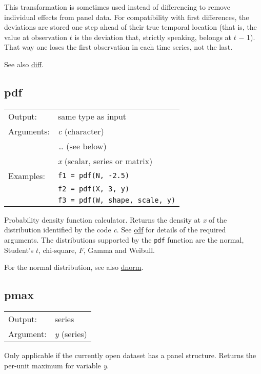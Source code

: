 	  This transformation is sometimes used instead of differencing to
	  remove individual effects from panel data.  For compatibility with
	  first differences, the deviations are stored one step ahead of their
	  true temporal location (that is, the value at observation
	  \ensuremath{t} is the deviation that, strictly speaking, belongs at
	  \ensuremath{t} $-$ 1).  That way one loses the first observation
	  in each time series, not the last.

	  See also \hyperlink{func-diff}{diff}.

\subsection{pdf}
\hypertarget{func-pdf}{}

\begin{tabular}{ll}
Output:     & same type as input\\
Arguments:  & \textsl{c} (character)\\
           & \textsl{\dots{}} (see below)\\
           & \textsl{x} (scalar, series or matrix)\\
Examples:    & \texttt{f1 = pdf(N, -2.5)} \\ 
 & \texttt{f2 = pdf(X, 3, y)} \\ 
 & \texttt{f3 = pdf(W, shape, scale, y)}
\end{tabular}

	  Probability density function calculator. Returns the density at
	  \textsl{x} of the distribution identified by the code
	  \textsl{c}.  See \hyperlink{func-cdf}{cdf} for details of the
	  required arguments.  The distributions supported by the
	  \texttt{pdf} function are the normal, Student's \ensuremath{t},
	  chi-square, \ensuremath{F}, Gamma and Weibull.

	  For the normal distribution, see also \hyperlink{func-dnorm}{dnorm}.

\subsection{pmax}
\hypertarget{func-pmax}{}

\begin{tabular}{ll}
Output:     & series\\
Argument:   & \textsl{y} (series)\\
\end{tabular}

	  Only applicable if the currently open dataset has a panel
	  structure. Returns the per-unit maximum for variable
	  \textsl{y}.

